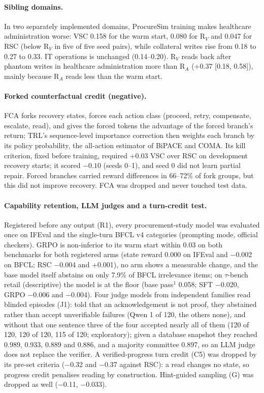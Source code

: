 \documentclass[11pt]{article}
\newcommand{\RV}{R$_V$}
\newcommand{\RA}{R$_A$}
\begin{document}
\paragraph{Sibling domains.} In two separately implemented domains, ProcureSim training makes healthcare administration worse: VSC 0.158 for the warm start, 0.080 for \RV{} and 0.047 for RSC (below \RV{} in five of five seed pairs), while collateral writes rise from 0.18 to 0.27 to 0.33. IT operations is unchanged (0.14--0.20). \RV{} reads back after phantom writes in healthcare administration more than \RA{} (+0.37 [0.18, 0.58]), mainly because \RA{} reads less than the warm start.

\paragraph{Forked counterfactual credit (negative).} FCA forks recovery states, forces each action class (proceed, retry, compensate, escalate, read), and gives the forced tokens the advantage of the forced branch's return; TRL's sequence-level importance correction then weights each branch by its policy probability, the all-action estimator of BiPACE and COMA. Its kill criterion, fixed before training, required +0.03 VSC over RSC on development recovery starts; it scored $-0.10$ (seeds 0--1), and seed 0 did not learn partial repair. Forced branches carried reward differences in 66--72\% of fork groups, but this did not improve recovery. FCA was dropped and never touched test data.

\paragraph{Capability retention, LLM judges and a turn-credit test.} Registered before any output (R1), every procurement-study model was evaluated once on IFEval and the single-turn BFCL v4 categories (prompting mode, official checkers). GRPO is non-inferior to its warm start within 0.03 on both benchmarks for both registered arms (state reward 0.000 on IFEval and $-$0.002 on BFCL; RSC $-$0.004 and +0.001), no arm shows a measurable change, and the base model itself abstains on only 7.9\% of BFCL irrelevance items; on $\tau$-bench retail (descriptive) the model is at the floor (base pass$^1$ 0.058; SFT $-$0.020, GRPO $-$0.006 and $-$0.004). Four judge models from independent families read blinded episodes (J1): told that an acknowledgement is not proof, they abstained rather than accept unverifiable failures (Qwen 1 of 120, the others none), and without that one sentence three of the four accepted nearly all of them (120 of 120, 120 of 120, 115 of 120; exploratory); given a database snapshot they reached 0.989, 0.933, 0.889 and 0.886, and a majority committee 0.897, so an LLM judge does not replace the verifier. A verified-progress turn credit (C5) was dropped by its pre-set criteria ($-$0.32 and $-$0.37 against RSC): a read changes no state, so progress credit penalises reading by construction. Hint-guided sampling (G) was dropped as well ($-$0.11, $-$0.033).
\end{document}
